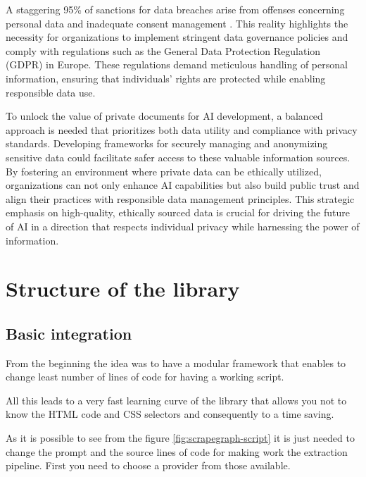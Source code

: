 A staggering 95\% of sanctions for data breaches arise from offenses concerning personal data and inadequate consent management \cite{13}. This reality highlights the necessity for organizations to implement stringent data governance policies and comply with regulations such as the General Data Protection Regulation (GDPR) in Europe. These regulations demand meticulous handling of personal information, ensuring that individuals' rights are protected while enabling responsible data use.

To unlock the value of private documents for AI development, a balanced approach is needed that prioritizes both data utility and compliance with privacy standards. Developing frameworks for securely managing and anonymizing sensitive data could facilitate safer access to these valuable information sources. By fostering an environment where private data can be ethically utilized, organizations can not only enhance AI capabilities but also build public trust and align their practices with responsible data management principles. This strategic emphasis on high-quality, ethically sourced data is crucial for driving the future of AI in a direction that respects individual privacy while harnessing the power of information.
\newpage

\section{Structure of the library}
\subsection{Basic integration}

From the beginning the idea was to have a modular framework that enables to change least number of lines of code for having a working script. 

All this leads to a very fast learning curve of the library that allows you not to know the HTML code and CSS selectors and consequently to a time saving.

As it is possible to see from the figure \ref{fig:scrapegraph-script} it is just needed to change the prompt and the source lines of code for making work the extraction pipeline. First you need to choose a provider from those available.

